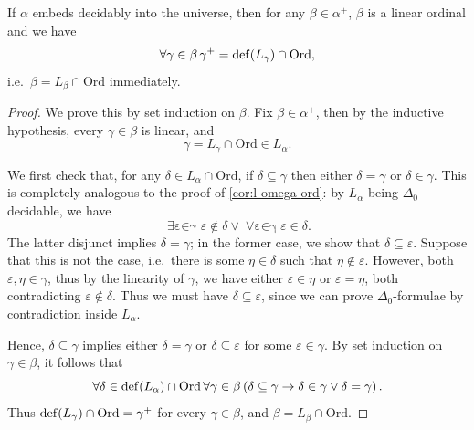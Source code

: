 \documentclass[12pt,openany]{book}
\theoremstyle{plain}
\theoremstyle{definition}
\newcommand\opA[1]{\mathop{\forall #1}}
\newcommand\opE[1]{\mathop{\exists #1}}
\DeclareMathOperator\dd{def}
\newcommand\IKP{\mathrm{IKP}}
\newcommand\Ord{\mathrm{Ord}}
\begin{document}
\begin{lemma}[$\IKP$]
  \label{lem:dec-emb-def-in-l}
  If $\alpha$ embeds decidably into the universe, then for any $\beta \in \alpha^+$, $\beta$ is a linear ordinal and we have
  \[\opA{\gamma \in \beta} \gamma^+ = \dd\mleft(L_\gamma\mright) \cap \Ord,\]
  i.e.\ $\beta = L_\beta \cap \Ord$ immediately.
\end{lemma}

\begin{proof}
  We prove this by set induction on $\beta$. Fix $\beta \in \alpha^+$, then by the inductive hypothesis, every $\gamma \in \beta$ is linear, and
  \[\gamma = L_\gamma \cap \Ord \in L_\alpha.\]

  We first check that, for any $\delta \in L_\alpha \cap \Ord$, if $\delta \subseteq \gamma$ then either $\delta = \gamma$ or $\delta \in \gamma$. This is completely analogous to the proof of \autoref{cor:l-omega-ord}: by $L_\alpha$ being $\Delta_0$-decidable, we have
  \[\opE{\varepsilon \in \gamma} \varepsilon \not\in \delta \lor \opA{\varepsilon \in \gamma} \varepsilon \in \delta.\]
  The latter disjunct implies $\delta = \gamma$; in the former case, we show that $\delta \subseteq \varepsilon$. Suppose that this is not the case, i.e.\ there is some $\eta \in \delta$ such that $\eta \not\in \varepsilon$. However, both $\varepsilon, \eta \in \gamma$, thus by the linearity of $\gamma$, we have either $\varepsilon \in \eta$ or $\varepsilon = \eta$, both contradicting $\varepsilon \not\in \delta$. Thus we must have $\delta \subseteq \varepsilon$, since we can prove $\Delta_0$-formulae by contradiction inside $L_\alpha$.

  Hence, $\delta \subseteq \gamma$ implies either $\delta = \gamma$ or $\delta \subseteq \varepsilon$ for some $\varepsilon \in \gamma$. By set induction on $\gamma \in \beta$, it follows that
  \[\opA{\delta \in \dd\mleft(L_\alpha\mright) \cap \Ord} \opA{\gamma \in \beta} \left(\delta \subseteq \gamma \rightarrow \delta \in \gamma \lor \delta = \gamma\right).\]
  Thus $\dd\mleft(L_\gamma\mright) \cap \Ord = \gamma^+$ for every $\gamma \in \beta$, and $\beta = L_\beta \cap \Ord$.


\end{proof}
\end{document}
